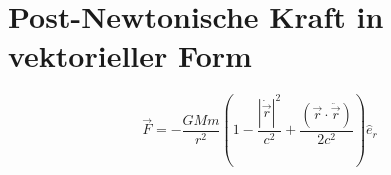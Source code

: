 \section{Post-Newtonische Kraft in vektorieller Form}
\[
\vec{F} = -\frac{GMm}{r^2}\left(1 - \frac{|\dot{\vec{r}}|^2}{c^2} + \frac{(\vec{r} \cdot \ddot{\vec{r}})}{2c^2}\right)\hat{e}_r
\]